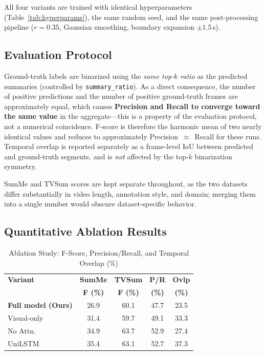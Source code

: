 \documentclass[10pt,conference]{IEEEtran}
\begin{document}
All four variants are trained with identical hyperparameters (Table~\ref{tab:hyperparams}),
the same random seed, and the same post-processing pipeline ($r{=}0.35$,
Gaussian smoothing, boundary expansion $\pm 1.5$\,s).

\subsection{Evaluation Protocol}

Ground-truth labels are binarized using the \emph{same top-$k$ ratio}
as the predicted summaries (controlled by \texttt{summary\_ratio}). As a
direct consequence, the number of positive predictions and the number of
positive ground-truth frames are approximately equal, which causes
\textbf{Precision and Recall to converge toward the same value} in the
aggregate---this is a property of the evaluation protocol, not a numerical
coincidence. F-score is therefore the harmonic mean of two nearly identical
values and reduces to approximately Precision~$\approx$~Recall for these
runs. Temporal overlap is reported separately as a frame-level IoU between
predicted and ground-truth segments, and is \emph{not} affected by the
top-$k$ binarization symmetry.

SumMe and TVSum scores are kept separate throughout, as the two datasets
differ substantially in video length, annotation style, and domain; merging
them into a single number would obscure dataset-specific behavior.

\subsection{Quantitative Ablation Results}

\begin{table}[h]
\centering
\caption{Ablation Study: F-Score, Precision/Recall, and Temporal Overlap (\%)}
\label{tab:ablation_results}
\setlength{\tabcolsep}{4pt}
\begin{tabular}{p{3.0cm}cccc}
\toprule
\textbf{Variant} & \textbf{SumMe} & \textbf{TVSum} & \textbf{P/R} & \textbf{Ovlp} \\
 & \textbf{F (\%)} & \textbf{F (\%)} & \textbf{(\%)} & \textbf{(\%)} \\
\midrule
\textbf{Full model (Ours)}  & 26.9 & 60.1 & 47.7 & 23.5 \\
Visual-only                 & 31.4 & 59.7 & 49.1 & 33.3 \\
No Attn.                    & 34.9 & 63.7 & 52.9 & 27.4 \\
UniLSTM                     & 35.4 & 63.1 & 52.7 & 37.3 \\
\bottomrule
\end{tabular}
\end{table}
\end{document}
